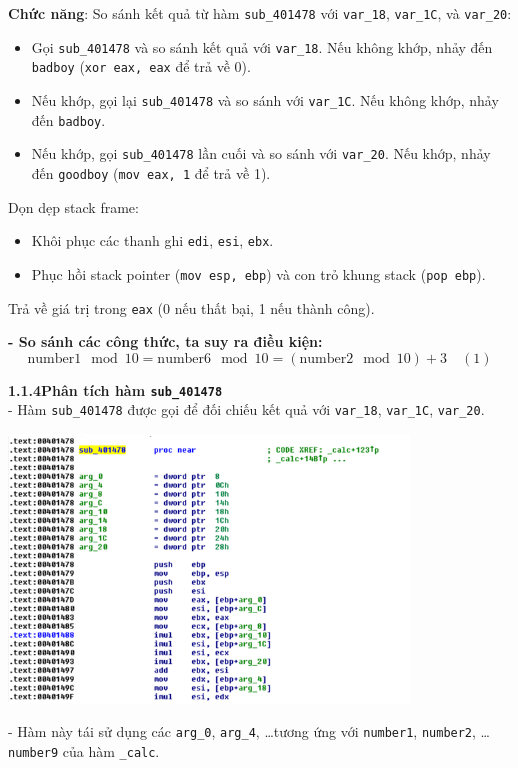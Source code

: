 \textbf{Chức năng}: So sánh kết quả từ hàm \texttt{sub\_401478} với \texttt{var\_18}, \texttt{var\_1C}, và \texttt{var\_20}:
\begin{itemize}
	\item Gọi \texttt{sub\_401478} và so sánh kết quả với \texttt{var\_18}. Nếu không khớp, nhảy đến \texttt{badboy} (\texttt{xor eax, eax} để trả về 0).
	\item Nếu khớp, gọi lại \texttt{sub\_401478} và so sánh với \texttt{var\_1C}. Nếu không khớp, nhảy đến \texttt{badboy}.
	\item Nếu khớp, gọi \texttt{sub\_401478} lần cuối và so sánh với \texttt{var\_20}. Nếu khớp, nhảy đến \texttt{goodboy} (\texttt{mov eax, 1} để trả về 1).
\end{itemize}
Dọn dẹp stack frame:
\begin{itemize}
	\item Khôi phục các thanh ghi \texttt{edi}, \texttt{esi}, \texttt{ebx}.
	\item Phục hồi stack pointer (\texttt{mov esp, ebp}) và con trỏ khung stack (\texttt{pop ebp}).
\end{itemize}
Trả về giá trị trong \texttt{eax} (0 nếu thất bại, 1 nếu thành công).

\textbf{- So sánh các công thức, ta suy ra điều kiện:}
\[
\text{number1} \mod 10 = \text{number6} \mod 10 = (\text{number2} \mod 10) + 3 \quad (1)
\]

\noindent\textbf{1.1.4\quad Phân tích hàm \texttt{sub\_401478}}\\
- Hàm \texttt{sub\_401478} được gọi để đối chiếu kết quả với \texttt{var\_18}, \texttt{var\_1C}, \texttt{var\_20}.
\begin{center}
	\includegraphics[width=0.8\textwidth]{img/file-1/image6.png}
\end{center}

- Hàm này tái sử dụng các \texttt{arg\_0}, \texttt{arg\_4}, \ldots tương ứng với \texttt{number1}, \texttt{number2}, \ldots \texttt{number9} của hàm \texttt{\_calc}.\\

